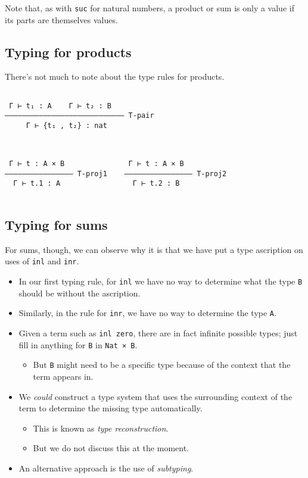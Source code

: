 \documentclass[11pt]{article}
\theoremstyle{definition}
\begin{document}
Note that, as with \texttt{suc} for natural numbers, a product or sum
is only a value if its parts are themselves values.

\subsection{Typing for products}
\label{sec:org86a3cae}

There's not much to note about the type rules for products.

\begin{verbatim}

 Γ ⊢ t₁ : A    Γ ⊢ t₂ : B                               
–––––––––––––––––––––––––––– T-pair
     Γ ⊢ {t₁ , t₂} : nat
 
\end{verbatim}

\begin{verbatim}

 Γ ⊢ t : A × B               Γ ⊢ t : A × B          
–––––––––––––––– T-proj1    –––––––––––––––– T-proj2
  Γ ⊢ t.1 : A                 Γ ⊢ t.2 : B           
 
\end{verbatim}

\subsection{Typing for sums}
\label{sec:org7892f40}

For sums, though, we can observe why it is that
we have put a type ascription on uses of \texttt{inl} and \texttt{inr}.
\begin{itemize}
\item In our first typing rule, for \texttt{inl} we have no way to determine
what the type \texttt{B} should be without the ascription.
\item Similarly, in the rule for \texttt{inr}, we have no way to determine the type \texttt{A}.
\item Given a term such as \texttt{inl zero}, there are in fact infinite possible
types; just fill in anything for \texttt{B} in \texttt{Nat × B}.
\begin{itemize}
\item But \texttt{B} might need to be a specific type because of the context
that the term appears in.
\end{itemize}
\item We \emph{could} construct a type system that uses the surrounding context
of the term to determine the missing type automatically.
\begin{itemize}
\item This is known as \emph{type reconstruction}.
\item But we do not discuss this at the moment.
\end{itemize}
\item An alternative approach is the use of \emph{subtyping}.
\end{itemize}
\end{document}
